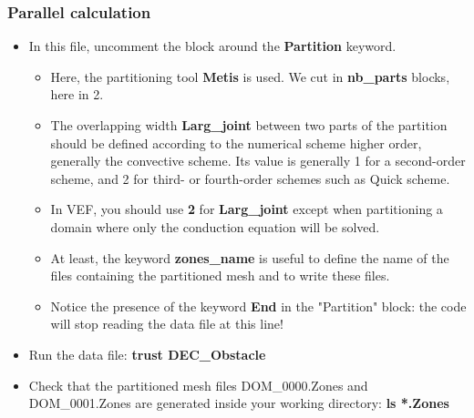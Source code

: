 \documentclass[10pt, hyperref={unicode=true,pdfusetitle, bookmarks=true,bookmarksnumbered=false,bookmarksopen=false, breaklinks=false,pdfborder={0 0l 1},backref=true,colorlinks=true,linkcolor=darkblue,pageanchor}]{beamer}
\begin{document}
\begin{frame}
\frametitle{Parallel calculation}
\begin{block}{}

\begin{itemize}
\item In this file, uncomment the block around the \textbf{Partition} keyword.
    \begin{itemize}
    \item [$\circ$] Here, the partitioning tool \textbf{Metis} is used. We cut in \textbf{nb\_parts} blocks, here in 2.
    \item [$\circ$] The overlapping width \textbf{Larg\_joint} between two parts of the partition should be defined according to the numerical scheme higher order, generally the convective scheme. Its value is generally 1 for a second-order scheme, and 2 for third- or fourth-order schemes such as Quick scheme.
    \item [$\circ$] In VEF, you should use \textbf{2} for \textbf{Larg\_joint} except when partitioning a domain where only the conduction equation will be solved.
    \item [$\circ$] At least, the keyword \textbf{zones\_name} is useful to define the name of the files containing the partitioned mesh and to write these files.
    \item [$\circ$] Notice the presence of the keyword \textbf{End} in the "Partition" block: the code will stop reading the data file at this line!
    \end{itemize}

\item Run the data file: \textbf{trust DEC\_Obstacle}

\item Check that the partitioned mesh files DOM\_0000.Zones and DOM\_0001.Zones are generated inside your working directory: \textbf{ls *.Zones}
\end{itemize}

\end{block}
\end{frame}
\end{document}
